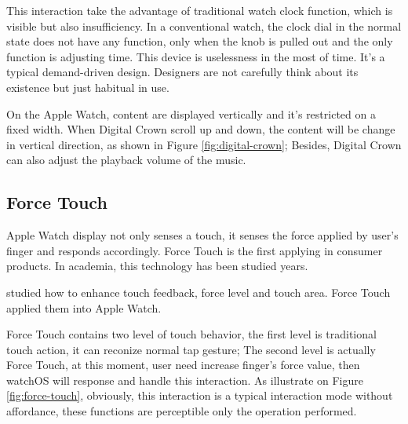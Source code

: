 This interaction take the advantage of traditional watch clock function, which is visible but also insufficiency.
In a conventional watch, the clock dial in the normal state does not have any function, only when the knob is pulled out and the only function is adjusting time. This device is uselessness in the most of time. It's a typical demand-driven design. Designers are not carefully think about its existence but just habitual in use.

On the Apple Watch, content are displayed vertically and it's restricted on a fixed width.
When Digital Crown scroll up and down, the content will be change in vertical direction, as shown in Figure \ref{fig:digital-crown}; Besides, Digital Crown can also adjust the playback volume of the music.

\subsection{Force Touch}

Apple Watch display not only senses a touch, it senses the force applied by user's finger and responds accordingly. Force Touch is the first applying in consumer products. In academia, this technology has been studied years.

\cite{Boring:2012ea,Buschek:2015cd,Vogel:2007:STO:1240624.1240727} studied how to enhance touch feedback, force level and touch area. Force Touch applied them into Apple Watch.

Force Touch contains two level of touch behavior, the first level is traditional touch action, it can reconize normal tap gesture;
The second level is actually Force Touch, at this moment, user need increase finger's force value, then watchOS will response and handle this interaction.
As illustrate on Figure \ref{fig:force-touch}, obviously, this interaction is a typical interaction mode without affordance, these functions are perceptible only the operation performed.

